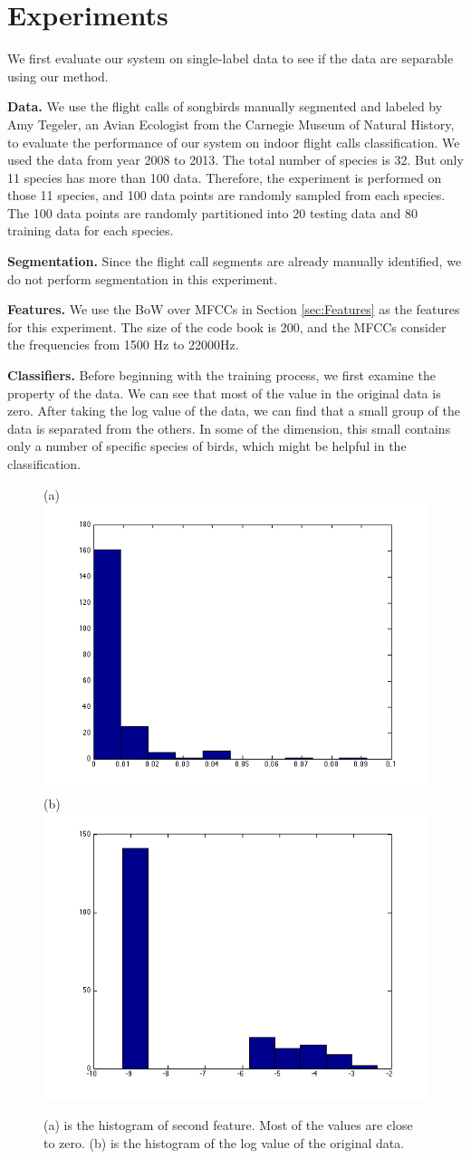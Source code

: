 \documentclass{article} %
\begin{document}
 

\section{Experiments}

We first evaluate our system on single-label data to see if the data are separable using our method.

\textbf{Data.}  We use the flight calls of songbirds manually segmented and labeled by Amy Tegeler, an Avian Ecologist from the Carnegie Museum of Natural History, to evaluate the performance of our system on indoor flight calls classification. We used the data from year 2008 to 2013. The total number of species is 32. But only 11 species has more than 100 data. Therefore, the experiment is performed on those 11 species, and 100 data points are randomly sampled from each species. The 100 data points are randomly partitioned into 20 testing data and 80 training data for each species.

\textbf{Segmentation.}
Since the flight call segments are already manually identified, we do not perform segmentation in this experiment.

\textbf{Features.}
We use the BoW over MFCCs in Section \ref{sec:Features} as the features for this experiment. The size of the code book is 200, and the MFCCs consider the frequencies from 1500 Hz to 22000Hz.

\textbf{Classifiers.}
Before beginning with the training process, we first examine the property of the data. We can see that most of the value in the original data is zero. After taking the log value of the data, we can find that a small group of the data is separated from the others. In some of the dimension, this small contains only a number of specific species of birds, which might be helpful in the classification.

\begin{figure}[b!]
    \centering
    {(a)\includegraphics[width=0.38\linewidth]{../Figure/Train_features}
    (b)\includegraphics[width=0.38\linewidth]{../Figure/Train_features_log}}
    \caption{(a) is the histogram of second feature. Most of the values are close to zero. (b) is the histogram of the log value of the original data.}
    \label{fig:hist}
\end{figure}
\end{document}
